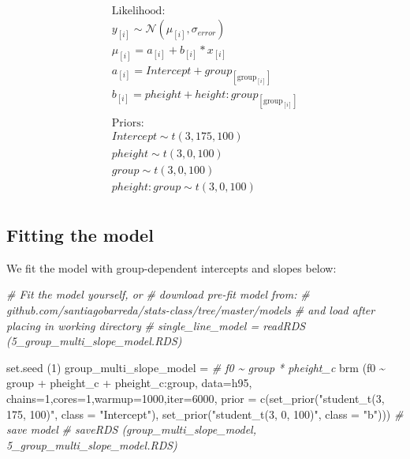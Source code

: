 \documentclass[
]{book}
\newenvironment{Shaded}{\begin{snugshade}}{\end{snugshade}}
\newcommand{\AttributeTok}[1]{\textcolor[rgb]{0.77,0.63,0.00}{#1}}
\newcommand{\CommentTok}[1]{\textcolor[rgb]{0.56,0.35,0.01}{\textit{#1}}}
\newcommand{\DecValTok}[1]{\textcolor[rgb]{0.00,0.00,0.81}{#1}}
\newcommand{\FunctionTok}[1]{\textcolor[rgb]{0.00,0.00,0.00}{#1}}
\newcommand{\NormalTok}[1]{#1}
\newcommand{\OtherTok}[1]{\textcolor[rgb]{0.56,0.35,0.01}{#1}}
\newcommand{\SpecialCharTok}[1]{\textcolor[rgb]{0.00,0.00,0.00}{#1}}
\newcommand{\StringTok}[1]{\textcolor[rgb]{0.31,0.60,0.02}{#1}}
\begin{document}
\begin{equation}
\begin{split}
\textrm{Likelihood:} \\
y_{[i]} \sim \mathcal{N}(\mu_{[i]},\sigma_{error}) \\
\mu_{[i]} = a_{[i]} + b_{[i]} * x_{[i]}  \\ 
a_{[i]} = Intercept + group_{[\mathrm{group}_{[i]}]} \\
b_{[i]} = pheight + height \colon group_{[\mathrm{group}_{[i]}]} \\ \\
\textrm{Priors:} \\
Intercept \sim t(3, 175, 100) \\
pheight \sim t(3, 0, 100) \\ 
group \sim t(3, 0, 100) \\ 
pheight \colon group \sim t(3, 0, 100) \\ 
\end{split}
\label{eq:516}
\end{equation}

\hypertarget{fitting-the-model-5}{%
\subsection{Fitting the model}\label{fitting-the-model-5}}

We fit the model with group-dependent intercepts and slopes below:

\begin{Shaded}
\begin{Highlighting}[]
\CommentTok{\# Fit the model yourself, or}
\CommentTok{\# download pre{-}fit model from: }
\CommentTok{\# github.com/santiagobarreda/stats{-}class/tree/master/models}
\CommentTok{\# and load after placing in working directory}
\CommentTok{\# single\_line\_model = readRDS (\textquotesingle{}5\_group\_multi\_slope\_model.RDS\textquotesingle{})}

\FunctionTok{set.seed}\NormalTok{ (}\DecValTok{1}\NormalTok{)}
\NormalTok{group\_multi\_slope\_model }\OtherTok{=}
  \CommentTok{\#   f0 \textasciitilde{} group * pheight\_c}
  \FunctionTok{brm}\NormalTok{ (f0 }\SpecialCharTok{\textasciitilde{}}\NormalTok{ group }\SpecialCharTok{+}\NormalTok{ pheight\_c }\SpecialCharTok{+}\NormalTok{ pheight\_c}\SpecialCharTok{:}\NormalTok{group, }
       \AttributeTok{data=}\NormalTok{h95, }\AttributeTok{chains=}\DecValTok{1}\NormalTok{,}\AttributeTok{cores=}\DecValTok{1}\NormalTok{,}\AttributeTok{warmup=}\DecValTok{1000}\NormalTok{,}\AttributeTok{iter=}\DecValTok{6000}\NormalTok{,}
       \AttributeTok{prior =} \FunctionTok{c}\NormalTok{(}\FunctionTok{set\_prior}\NormalTok{(}\StringTok{"student\_t(3, 175, 100)"}\NormalTok{, }\AttributeTok{class =} \StringTok{"Intercept"}\NormalTok{),}
                 \FunctionTok{set\_prior}\NormalTok{(}\StringTok{"student\_t(3, 0, 100)"}\NormalTok{, }\AttributeTok{class =} \StringTok{"b"}\NormalTok{)))}
\CommentTok{\# save model}
\CommentTok{\# saveRDS (group\_multi\_slope\_model, \textquotesingle{}5\_group\_multi\_slope\_model.RDS\textquotesingle{})}
\end{Highlighting}
\end{Shaded}
\end{document}
